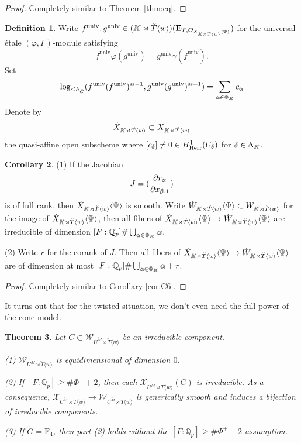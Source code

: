 \documentclass[11pt]{amsart}
\newtheorem{thm}{Theorem}[section]
\theoremstyle{definition}
\newtheorem{cor}[thm]{Corollary}
\newtheorem{defn}[thm]{Definition}
\newcommand{\doublestroke}[1]{\pdfliteral{1 Tr .3 w}#1\pdfliteral{0 Tr 0 w}}
\newcommand{\BPhi}{\doublestroke{\Phi}}
\newcommand{\BPsi}{\doublestroke{\Psi}}
\newcommand{\BK}{\doublestroke{K}}
\newcommand{\Balpha}{\doublestroke{\alpha}}
\newcommand{\Bbeta}{\doublestroke{\beta}}
\newcommand{\Bdelta}{\doublestroke{\delta}}
\newcommand{\BDelta}{%
    \scalebox{.8}{$\Delta$}%
    \llap{%
            \scalebox{.9}{$\Delta$}%
    }%
}
\newcommand{\Q}{\mathbb{Q}}
\newcommand{\bfE}{\mathbf{E}}
\renewcommand{\SS}{{\operatorname{ss}}}
\newcommand{\cO}{\mathcal{O}}
\newcommand{\cX}{\mathcal{X}}
\newcommand{\cW}{\mathcal{W}}
\newcommand{\bG}{\breve{G}}
\newcommand{\bM}{\breve{M}}
\newcommand{\bT}{\breve{T}}
\newcommand{\univ}{{\operatorname{univ}}}
\newcommand{\Herr}{\mathrm{Herr}}
\begin{document}
\begin{proof}
Completely similar to Theorem \ref{thm:eq}.
\end{proof}

\begin{defn}
Write $f^\univ, g^\univ
\in (\BK\rtimes \bT \langle w \rangle)(\bfE_{F,
\cO_{X_{\BK\rtimes \bT \langle w\rangle}\langle\BPsi\rangle}})$
for the universal \'etale $(\varphi, \Gamma)$-module
satisfying
\[
f^\univ \varphi(g^\univ)=g^\univ \gamma(f^\univ).
\]
Set
\[
\log_{\le h_{\bG}}(f^\univ (f^{\univ})^{\SS-1},
g^{\univ}(g^{\univ})^{\SS-1})
=\sum_{\Balpha\in \BPhi_{\BK}}c_{\Balpha}
\]
Denote by
\[
\dot X_{\BK\rtimes \bT\langle w\rangle}
\subset
 X_{\BK\rtimes \bT\langle w\rangle}
\]
the quasi-affine open subscheme
where
$[c_{\Bdelta}]\neq 0\in 
H^1_{\Herr}(U_{\Bdelta})$
for $\Bdelta\in \BDelta_{\BK}$.
\end{defn}

\begin{cor}
\label{cor:w-C6}
(1) If
the Jacobian
\[
J=(\frac{\partial r_{\Balpha}}{\partial x_{\Bbeta,1}})
\]
is of full rank,
then
$\dot X_{\BK\rtimes \bT \langle w\rangle}
\langle \BPsi\rangle$
is smooth.
Write 
$\dot W_{\BK\rtimes \bT \langle w\rangle}\langle\Psi\rangle\subset W_{\BK\rtimes \bT \langle w\rangle}$
for the image of 
$\dot X_{\BK\rtimes \bT \langle w\rangle}
\langle \BPsi\rangle$,
then
all fibers of
$\dot X_{\BK\rtimes \bT \langle w\rangle}
\langle \BPsi\rangle\to
\dot W_{\BK\rtimes \bT \langle w\rangle}
\langle \BPsi\rangle$
are irreducible of dimension
$[F:\Q_p]\#\bigcup_{\Balpha\in \BPhi_{\BK}}\Balpha$.

(2)
Write $r$ for the corank of $J$.
Then
all fibers of
$\dot X_{\BK\rtimes \bT \langle w\rangle}
\langle \BPsi\rangle\to
\dot W_{\BK\rtimes \bT \langle w\rangle}
\langle \BPsi\rangle$
are of dimension at most
$[F:\Q_p]\#\bigcup_{\Balpha\in \BPhi_{\BK}}\Balpha+r$.
\end{cor}

\begin{proof}
Completely similar to Corollary \ref{cor:C6}.
\end{proof}

It turns out that for the twisted situation,
we don't even need the full power of the cone model.

\begin{thm}
\rm
\label{thm:twist-reg}
Let $C\subset \cW_{U^{\bM}\rtimes \bT \langle w\rangle}$
be an irreducible component.


(1)
$\cW_{U^{\bM}\rtimes \bT \langle w\rangle}$
is equidimensional of dimension $0$.

(2)
If $[F:\Q_p]\ge \#\Phi^+ + 2$,
then
each $\cX_{U^{\bM}\rtimes \bT \langle w\rangle}(C)$
is irreducible.
As a consequence,
$
\cX_{U^{\bM}\rtimes \bT \langle w\rangle}
\to
\cW_{U^{\bM}\rtimes \bT \langle w\rangle}
$
is generically smooth and induces a bijection
of irreducible components.


(3)
If $\bG=\mathrm{F}_4$,
then part (2) holds without the $[F:\Q_p]\ge \#\Phi^+ + 2$
assumption.
\end{thm}
\end{document}
